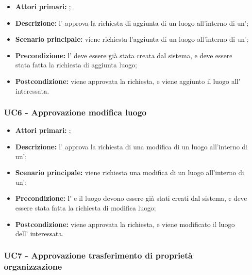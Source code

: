 \documentclass[casi-duso]{subfiles}
\begin{document}
\begin{itemize}
  \item \textbf{Attori primari:} ;
  \item \textbf{Descrizione:} l' approva la richiesta di aggiunta di un luogo all'interno di un';
  \item \textbf{Scenario principale:} viene richiesta l'aggiunta di un luogo all'interno di un';
  \item \textbf{Precondizione:} l' deve essere già stata creata dal sistema, e deve essere stata fatta la richiesta di aggiunta luogo;
  \item \textbf{Postcondizione:} viene approvata la richiesta, e viene aggiunto il luogo all' interessata.

\end{itemize}
\subsubsection{UC6 - Approvazione modifica luogo}
\label{subsub:UC6}

\begin{itemize}
  \item \textbf{Attori primari:} ;
  \item \textbf{Descrizione:} l' approva la richiesta di una modifica di un luogo all'interno di un';
  \item \textbf{Scenario principale:} viene richiesta una modifica di un luogo all'interno di un';
  \item \textbf{Precondizione:} l' e il luogo devono essere già stati creati dal sistema, e deve essere stata fatta la richiesta di modifica luogo;
  \item \textbf{Postcondizione:} viene approvata la richiesta, e viene modificato il luogo dell' interessata.

\end{itemize}
\subsubsection{UC7 - Approvazione trasferimento di proprietà organizzazione}
\label{subsub:UC7}
\end{document}
